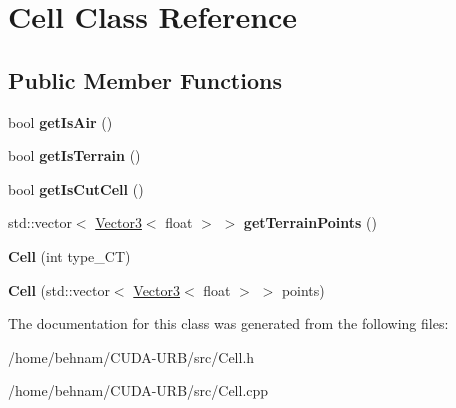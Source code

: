 \hypertarget{classCell}{}\section{Cell Class Reference}
\label{classCell}
\subsection*{Public Member Functions}
\begin{DoxyCompactItemize}
\item 
\mbox{\label{classCell_aa874e7ad3c62688dceed3a515466b72a}} 
bool {\bfseries get\+Is\+Air} ()
\item 
\mbox{\label{classCell_a13fba362f6cf077c9aae6b76cb804821}} 
bool {\bfseries get\+Is\+Terrain} ()
\item 
\mbox{\label{classCell_a5ab69f678e05c66388f1a7c204425eb2}} 
bool {\bfseries get\+Is\+Cut\+Cell} ()
\item 
\mbox{\label{classCell_ae367fdf7c82557dc6a545cf3e364eb77}} 
std\+::vector$<$ \hyperlink{classVector3}{Vector3}$<$ float $>$ $>$ {\bfseries get\+Terrain\+Points} ()
\item 
\mbox{\label{classCell_a605ab530a9945f4dde5e669c0aed42a7}} 
{\bfseries Cell} (int type\+\_\+\+CT)
\item 
\mbox{\label{classCell_a09ab8599cd1e5d35231870587dbbaaea}} 
{\bfseries Cell} (std\+::vector$<$ \hyperlink{classVector3}{Vector3}$<$ float $>$ $>$ points)
\end{DoxyCompactItemize}


The documentation for this class was generated from the following files\+:\begin{DoxyCompactItemize}
\item 
/home/behnam/\+C\+U\+D\+A-\/\+U\+R\+B/src/Cell.\+h\item 
/home/behnam/\+C\+U\+D\+A-\/\+U\+R\+B/src/Cell.\+cpp\end{DoxyCompactItemize}
